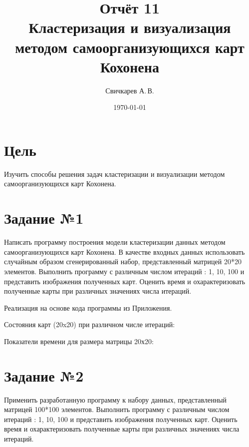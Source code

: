 \documentclass{article} %
\title{Отчёт 11\\
Кластеризация и визуализация\\
методом самоорганизующихся карт Кохонена} %
\author{Свичкарев А.\,В.} %
\date{\today} %
\begin{document}

\maketitle %

\section{Цель}
Изучить способы решения задач кластеризации и визуализации
методом самоорганизующихся карт Кохонена.

\section{Задание №1}
Написать программу построения
модели кластеризации данных методом
самоорганизующихся карт Кохонена.
В качестве входных данных использовать случайным
образом сгенерированный набор,
представленный матрицей 20*20 элементов.
Выполнить программу с различным числом итераций : 1, 10, 100 и
представить изображения полученных карт.
Оценить время и охарактеризовать полученные
карты при различных значениях числа итераций.

Реализация на основе кода программы из Приложения.

\clearpage
Состояния карт (20x20) при различном числе итераций:
\begin{figure}[H]
	\centering
	\hfill
\end{figure}
\begin{figure}[H]
	\centering
	\hfill
\end{figure}
\bigskip

Показатели времени для размера матрицы 20х20:


\clearpage
\section{Задание №2}
Применить разработанную программу к набору данных, представленный матрицей
100*100 элементов. Выполнить программу с различным числом итераций : 1, 10, 100 и
представить изображения полученных карт.
Оценить время и охарактеризовать полученные карты
при различных значениях числа итераций.
\end{document}
